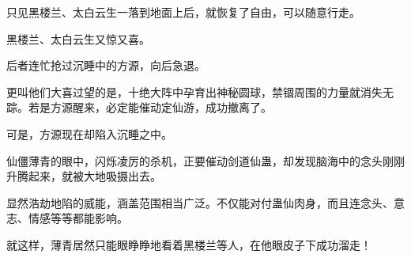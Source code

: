 \begin{this_body}
只见黑楼兰、太白云生一落到地面上后，就恢复了自由，可以随意行走。

黑楼兰、太白云生又惊又喜。

后者连忙抢过沉睡中的方源，向后急退。

更叫他们大喜过望的是，十绝大阵中孕育出神秘圆球，禁锢周围的力量就消失无踪。若是方源醒来，必定能催动定仙游，成功撤离了。

可是，方源现在却陷入沉睡之中。

仙僵薄青的眼中，闪烁凌厉的杀机，正要催动剑道仙蛊，却发现脑海中的念头刚刚升腾起来，就被大地吸摄出去。

显然浩劫地陷的威能，涵盖范围相当广泛。不仅能对付蛊仙肉身，而且连念头、意志、情感等等都能影响。

就这样，薄青居然只能眼睁睁地看着黑楼兰等人，在他眼皮子下成功溜走！

\end{this_body}

